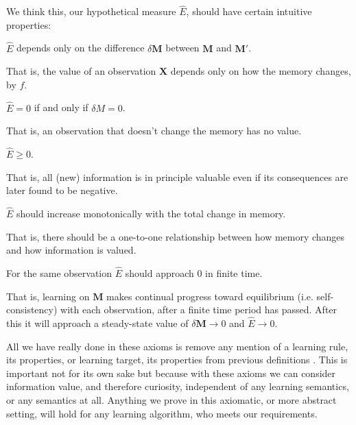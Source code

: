 We think this, our hypothetical measure $\hat E$, should have certain intuitive properties:

\begin{axiom}
	$\hat E$ depends only on the difference $\delta \mathbf{M}$ between $\mathbf{M}$ and $\mathbf{M'}$.
\end{axiom}

That is, the value of an observation $\mathbf{X}$ depends only on how
the memory changes, by $f$. 

\begin{axiom}
	$\hat E = 0$ if and only if $\delta M = 0$. 
\end{axiom}

That is, an observation that doesn’t change the memory has no value.

\begin{axiom}
	$\hat E \ge 0$.
\end{axiom}

That is, all (new) information is in principle valuable even if its consequences are later found to be negative.

\begin{axiom}
	$\hat E$ should increase monotonically with the total change in memory. 
\end{axiom}

That is, there should be a one-to-one relationship between how memory changes and how information is valued.

\begin{axiom}
	For the same observation $\hat E$ should approach 0 in finite time.
\end{axiom}

That is, learning on $\mathbf{M}$ makes continual progress toward equilibrium (i.e. self-consistency) with each observation, after a finite time period has passed. After this it will approach a steady-state value of $\delta \mathbf{M} \rightarrow 0$ and $\hat E \rightarrow 0$.

All we have really done in these axioms is remove any mention of a learning rule, its properties, or learning target, its properties from previous definitions \cite{Itti2009,Jaegle2019,Schmidhuber1991,Inglis2001,Reddy2016,Pirolli2007}. This is important not for its own sake but because with these axioms we can consider information value, and therefore curiosity, independent of any learning semantics, or any semantics at all. Anything we prove in this axiomatic, or more abstract setting, will hold for any learning algorithm, who meets our requirements. 

